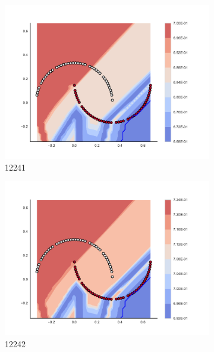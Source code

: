 \begin{figure}[h]
\begin{subfigure}[b]{0.09\textwidth}
    \includegraphics[clip, trim=2.35cm 1.75cm 4.5cm 0cm,width=\textwidth]{img/convergence/12241.pdf}
    \caption{12241}
    \label{fig:convergence_12241}
\end{subfigure}
%
\begin{subfigure}[b]{0.09\textwidth}
    \includegraphics[clip, trim=2.35cm 1.75cm 4.5cm 0cm,width=\textwidth]{img/convergence/12242.pdf}
    \caption{12242}
    \label{fig:convergence_12242}
\end{subfigure}
%
\begin{subfigure}[b]{0.09\textwidth}

\end{subfigure}
\end{figure}

